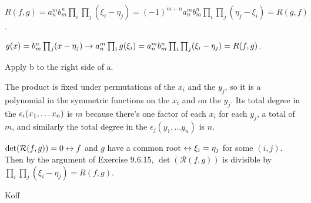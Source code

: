 \documentclass[11pt, oneside]{article}   	%
\begin{document}
\item \be
\item $R(f, g) = a_n^mb_m^n\prod_i\prod_j(\xi_i - \eta_j) = (-1)^{m+n}a_n^mb_m^n\prod_i\prod_j(\eta_j - \xi_i) = R(g, f)$.
\item $g(x) = b_m^n\prod_j(x-\eta_j) \rightarrow a_n^m\prod_ig(\xi_i) = a_n^mb_m^n\prod_i\prod_j(\xi_i - \eta_j)  = R(f, g)$.
\item Apply b to the right side of a.
\ee
\item The product is fixed under permutations of the $x_i$ and the $y_j$, so it is a polynomial in the symmetric functions on the $x_i$ and on the $y_j$. Its total degree in the $\epsilon_i(x_1, \ldots x_n)$ is $m$ because there's one factor of each $x_i$ for each $y_j$, a total of $m$, and similarly the total degree in the $\epsilon_j(y_1, \ldots y_n)$ is $n$.
\item $\det(\mathcal{R}(f, g)) = 0 \leftrightarrow f$ and $g$ have a common root $\leftrightarrow \xi_i = \eta_j$ for some $(i, j)$. Then by the argument of Exercise 9.6.15, $\det(\mathcal{R}(f, g))$ is divisible by $\prod_i\prod_j(\xi_i - \eta_j) = R(f, g)$. 
\item Koff
\ee
\end{document}

